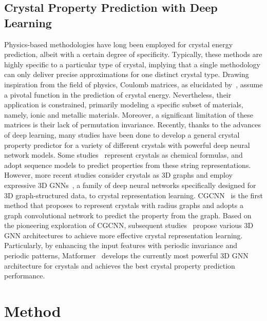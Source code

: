 \documentclass[nohyperref]{article}
\theoremstyle{plain}
\theoremstyle{definition}
\theoremstyle{remark}
\begin{document}
\subsection{Crystal Property Prediction with Deep Learning}
\label{related}

Physics-based methodologies have long been employed for crystal energy prediction, albeit with a certain degree of specificity. Typically, these methods are highly specific to a particular type of crystal, implying that a single methodology can only deliver precise approximations for one distinct crystal type. Drawing inspiration from the field of physics, Coulomb matrices, as elucidated by~\citep{rupp2012fast, elton2018applying}, assume a pivotal function in the prediction of crystal energy. Nevertheless, their application is constrained, primarily modeling a specific subset of materials, namely, ionic and metallic materials. Moreover, a significant limitation of these matrices is their lack of permutation invariance. Recently, thanks to the advances of deep learning, many studies have been done to develop a general crystal property predictor for a variety of different crystals with powerful deep neural network models. Some studies~\citep{behler2007generalized, crabnet,jha2018elemnet,jha2019irnet,goodall2020predicting} represent crystals as chemical formulas, and adopt sequence models to predict properties from these string representations. However, more recent studies consider crystals as 3D graphs and employ expressive 3D GNNs~\citep{schutt2017schnet,klicpera2020directional,liu2022spherical}, a family of deep neural networks specifically designed for 3D graph-structured data, to crystal representation learning. CGCNN~\citep{xie2018crystal} is the first method that proposes to represent crystals with radius graphs and adopts a graph convolutional network to predict the property from the graph. Based on the pioneering exploration of CGCNN, subsequent studies~\citep{CyAtt,GATGNN,MegNet,ALIGNN,nequip, OMEE2022100491} propose various 3D GNN architectures to achieve more effective crystal representation learning. Particularly, by enhancing the input features with periodic invariance and periodic patterns, Matformer~\citep{yan2022periodic} develops the currently most powerful 3D GNN architecture for crystals and achieves the best crystal property prediction performance.


\section{Method}
\end{document}
